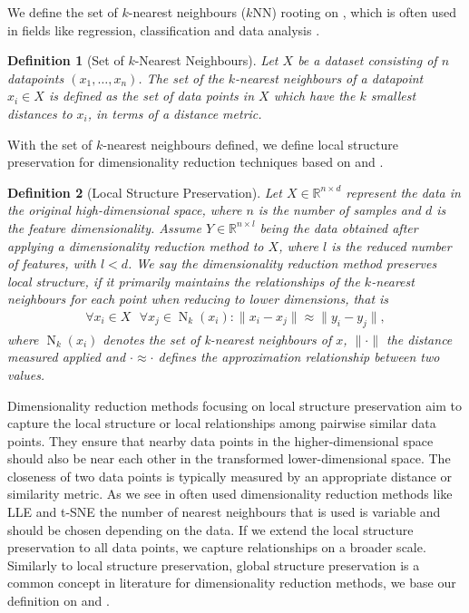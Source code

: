 \documentclass[pdftex,12pt,a4paper]{report}
\newtheorem{definition}{Definition}[section]
\begin{document}
We define the set of $k$-nearest neighbours ($k$NN) rooting on \cite{kNN}, which is often used in fields like regression, classification and data analysis \cite{kNN-application}.

\begin{definition}[Set of $k$-Nearest Neighbours] \label{kNN}
    Let $X$ be a dataset consisting of $n$ datapoints $ (x_1, \dots, x_n )$.
    The set of the $k$-nearest neighbours of a datapoint $x_i \in X$ is defined as the set of data points in $X$ which have the $k$ smallest distances to $x_i$, in terms of a distance metric.
\end{definition}

With the set of $k$-nearest neighbours defined, we define local structure preservation for dimensionality reduction techniques based on \cite{neighborhood-presv-embedding} and \cite{global-vs-local-nonlinear-dim-reduction}.
\begin{definition}[Local Structure Preservation]
    Let $X \in \mathbb{R}^{n \times d}$ represent the data in the original high-dimensional space, where $n$ is the number of samples and $d$ is the feature dimensionality.
    Assume $Y \in \mathbb{R}^{n \times l}$ being the data obtained after applying a dimensionality reduction method to $X$, where $l$ is the reduced number of features, with $l < d$.
    We say the dimensionality reduction method preserves local structure, if it primarily maintains the relationships of the $k$-nearest neighbours for each point when reducing to lower dimensions, that is 
    \begin{align*}
        \forall x_i \in X \text{   }\forall x_j \in \operatorname{N}_k (x_i): \| x_i - x_j \| \approx \| y_i - y_j \|,
    \end{align*}
    where $\operatorname{N}_k (x_i)$ denotes the set of k-nearest neighbours of $x$, $\| \cdot \| $ the distance measured applied and $ \cdot \approx \cdot$ defines the approximation relationship between two values. 
\end{definition}

Dimensionality reduction methods focusing on local structure preservation aim to capture the local structure or local relationships among pairwise similar data points.
They ensure that nearby data points in the higher-dimensional space should also be near each other in the transformed lower-dimensional space.
The closeness of two data points is typically measured by an appropriate distance or similarity metric.
As we see in often used dimensionality reduction methods like LLE \cite{LLE} and t-SNE \cite{t-SNE} the number of nearest neighbours that is used is variable and should be chosen depending on the data.
If we extend the local structure preservation to all data points, we capture relationships on a broader scale.
Similarly to local structure preservation, global structure preservation is a common concept in literature for dimensionality reduction methods, we base our definition on \cite{global-vs-local-nonlinear-dim-reduction} and \cite{global-local-structure}.
\end{document}
